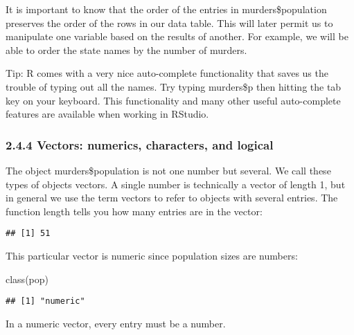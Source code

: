\documentclass[
]{article}
\newenvironment{Shaded}{\begin{snugshade}}{\end{snugshade}}
\newcommand{\FunctionTok}[1]{\textcolor[rgb]{0.00,0.00,0.00}{#1}}
\newcommand{\NormalTok}[1]{#1}
\newcommand{\OtherTok}[1]{\textcolor[rgb]{0.56,0.35,0.01}{#1}}
\newcommand{\SpecialCharTok}[1]{\textcolor[rgb]{0.00,0.00,0.00}{#1}}
\begin{document}
It is important to know that the order of the entries in
murders\$population preserves the order of the rows in our data table.
This will later permit us to manipulate one variable based on the
results of another. For example, we will be able to order the state
names by the number of murders.

Tip: R comes with a very nice auto-complete functionality that saves us
the trouble of typing out all the names. Try typing murders\$p then
hitting the tab key on your keyboard. This functionality and many other
useful auto-complete features are available when working in RStudio.

\hypertarget{vectors-numerics-characters-and-logical}{%
\subsubsection{2.4.4 Vectors: numerics, characters, and
logical}\label{vectors-numerics-characters-and-logical}}

The object murders\$population is not one number but several. We call
these types of objects vectors. A single number is technically a vector
of length 1, but in general we use the term vectors to refer to objects
with several entries. The function length tells you how many entries are
in the vector:

\begin{Shaded}
\end{Shaded}

\begin{verbatim}
## [1] 51
\end{verbatim}

This particular vector is numeric since population sizes are numbers:

\begin{Shaded}
\begin{Highlighting}[]
\FunctionTok{class}\NormalTok{(pop)}
\end{Highlighting}
\end{Shaded}

\begin{verbatim}
## [1] "numeric"
\end{verbatim}

In a numeric vector, every entry must be a number.
\end{document}
